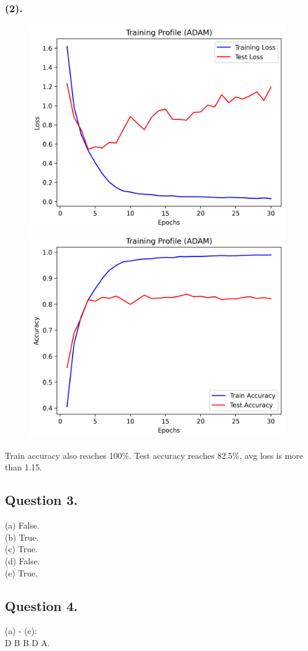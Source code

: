 \documentclass{article}
\begin{document}
\newpage
\subsubsection*{(2).}
\begin{figure}[htbp]
  \centering
  \includegraphics[scale=0.7]{pic/loss_curve_ADAM.png}
  \includegraphics[scale=0.7]{pic/accuracy_curve_ADAM.png}
\end{figure}
Train accuracy also reaches 100\%.
Test accuracy reaches 82.5\%, avg loss is more than 1.15.

\newpage
\subsection*{Question 3.}
(a) False.\\
(b) True.\\
(c) True.\\
(d) False.\\
(e) True.

\subsection*{Question 4.}
(a) - (e):\\
D B B D A.
\end{document}
